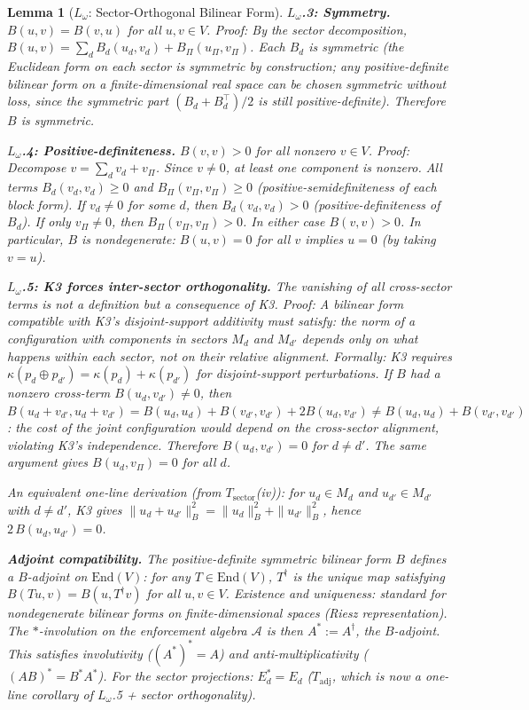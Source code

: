 \documentclass[11pt,a4paper]{article}
\newtheorem{lemma}[theorem]{Lemma}
\theoremstyle{definition}
\newcommand{\End}{\mathrm{End}}
\begin{document}
\begin{lemma}[$L_\omega$: Sector-Orthogonal Bilinear Form]
\medskip\noindent
\textbf{$L_\omega$.3: Symmetry.}
$B(u, v) = B(v, u)$ for all $u, v \in V$.  \textit{Proof:} By the sector decomposition, $B(u, v) = \sum_d B_d(u_d, v_d) + B_\Pi(u_\Pi, v_\Pi)$.  Each $B_d$ is symmetric (the Euclidean form on each sector is symmetric by construction; any positive-definite bilinear form on a finite-dimensional real space can be chosen symmetric without loss, since the symmetric part $(B_d + B_d^\top)/2$ is still positive-definite).  Therefore $B$ is symmetric.

\medskip\noindent
\textbf{$L_\omega$.4: Positive-definiteness.}
$B(v, v) > 0$ for all nonzero $v \in V$.  \textit{Proof:} Decompose $v = \sum_d v_d + v_\Pi$.  Since $v \ne 0$, at least one component is nonzero.  All terms $B_d(v_d, v_d) \ge 0$ and $B_\Pi(v_\Pi, v_\Pi) \ge 0$ (positive-semidefiniteness of each block form).  If $v_d \ne 0$ for some $d$, then $B_d(v_d, v_d) > 0$ (positive-definiteness of $B_d$).  If only $v_\Pi \ne 0$, then $B_\Pi(v_\Pi, v_\Pi) > 0$.  In either case $B(v,v) > 0$.  In particular, $B$ is nondegenerate: $B(u,v) = 0$ for all $v$ implies $u = 0$ (by taking $v = u$).

\medskip\noindent
\textbf{$L_\omega$.5: K3 forces inter-sector orthogonality.}
The vanishing of all cross-sector terms is not a definition but a \emph{consequence} of K3.  \textit{Proof:} A bilinear form compatible with K3's disjoint-support additivity must satisfy: the norm of a configuration with components in sectors $M_d$ and $M_{d'}$ depends only on what happens within each sector, not on their relative alignment.  Formally: K3 requires $\kappa(p_d \oplus p_{d'}) = \kappa(p_d) + \kappa(p_{d'})$ for disjoint-support perturbations.  If $B$ had a nonzero cross-term $B(u_d, v_{d'}) \ne 0$, then $B(u_d + v_{d'}, u_d + v_{d'}) = B(u_d, u_d) + B(v_{d'}, v_{d'}) + 2B(u_d, v_{d'}) \ne B(u_d, u_d) + B(v_{d'}, v_{d'})$: the cost of the joint configuration would depend on the cross-sector alignment, violating K3's independence.  Therefore $B(u_d, v_{d'}) = 0$ for $d \ne d'$.  The same argument gives $B(u_d, v_\Pi) = 0$ for all $d$.

An equivalent one-line derivation (from $T_{\mathrm{sector}}$(iv)): for $u_d \in M_d$ and $u_{d'} \in M_{d'}$ with $d \ne d'$, K3 gives $\|u_d + u_{d'}\|_B^2 = \|u_d\|_B^2 + \|u_{d'}\|_B^2$, hence $2\,B(u_d, u_{d'}) = 0$.

\medskip\noindent
\textbf{Adjoint compatibility.}
The positive-definite symmetric bilinear form $B$ defines a $B$-adjoint on $\End(V)$: for any $T \in \End(V)$, $T^\dagger$ is the unique map satisfying $B(Tu, v) = B(u, T^\dagger v)$ for all $u, v \in V$.  Existence and uniqueness: standard for nondegenerate bilinear forms on finite-dimensional spaces (Riesz representation).  The $*$-involution on the enforcement algebra $\mathcal{A}$ is then $A^* := A^\dagger$, the $B$-adjoint.  This satisfies involutivity ($(A^*)^* = A$) and anti-multiplicativity ($(AB)^* = B^* A^*$).  For the sector projections: $E_d^* = E_d$ ($T_{\mathrm{adj}}$, which is now a one-line corollary of $L_\omega$.5 + sector orthogonality).


\end{lemma}
\end{document}
